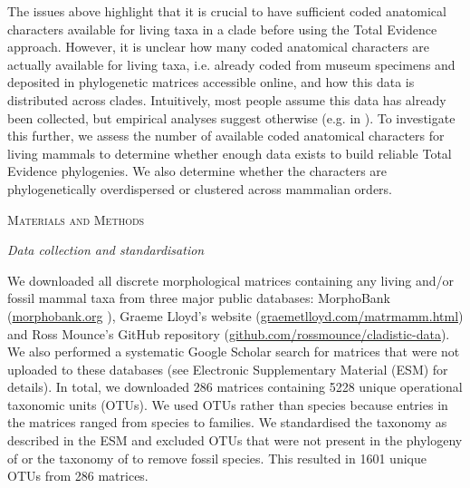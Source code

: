 \documentclass[12pt,letterpaper]{article}
\renewcommand{\section}[1]{%
\bigskip
\begin{center}
\begin{Large}
\normalfont\scshape #1
\medskip
\end{Large}
\end{center}}
\renewcommand{\subsection}[1]{%
\bigskip
\begin{center}
\begin{large}
\normalfont\itshape #1
\end{large}
\end{center}}
\begin{document}
The issues above highlight that it is crucial to have sufficient coded anatomical characters available for living taxa in a clade before using the Total Evidence approach.
However, it is unclear how many coded anatomical characters are actually available for living taxa, i.e. already coded from museum specimens and deposited in phylogenetic matrices accessible online, and how this data is distributed across clades.
Intuitively, most people assume this data has already been collected, but empirical analyses suggest otherwise (e.g. in \cite{ronquista2012,slaterphylogenetic2013,beckancient2014}).
To investigate this further, we assess the number of available coded anatomical characters for living mammals to determine whether enough data exists to build reliable Total Evidence phylogenies.
We also determine whether the characters are phylogenetically overdispersed or clustered across mammalian orders.
%
%
\section{Materials and Methods}
\subsection{Data collection and standardisation}
We downloaded all discrete morphological matrices containing any living and/or fossil mammal taxa from three major public databases: MorphoBank (\url{morphobank.org} \cite{morphobank}), Graeme Lloyd's website (\url{graemetlloyd.com/matrmamm.html}) and Ross Mounce's GitHub repository (\url{github.com/rossmounce/cladistic-data}).
We also performed a systematic Google Scholar search for matrices that were not uploaded to these databases (see Electronic Supplementary Material (ESM) for details).
In total, we downloaded 286 matrices containing 5228 unique operational taxonomic units (OTUs). 
We used OTUs rather than species because entries in the matrices ranged from species to families. 
We standardised the taxonomy as described in the ESM and excluded OTUs that were not present in the phylogeny of \cite{BinindaEmonds} or the taxonomy of \cite{wilson2005mammal} to remove fossil species.
This resulted in 1601 unique OTUs from 286 matrices.
\end{document}
